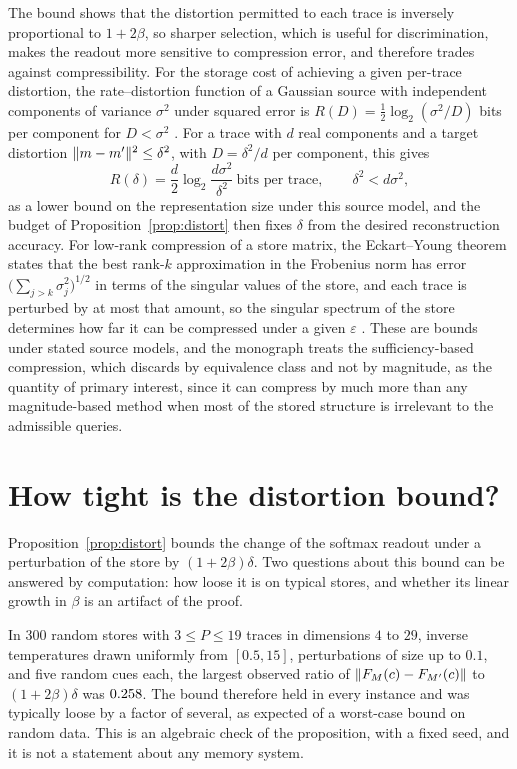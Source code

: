The bound shows that the distortion permitted to each trace is inversely proportional to $1+2\beta$, so sharper selection, which is useful for discrimination, makes the readout more sensitive to compression error, and therefore trades against compressibility. For the storage cost of achieving a given per-trace distortion, the rate--distortion function of a Gaussian source with independent components of variance $\sigma^2$ under squared error is $R(D)=\frac12\log_2(\sigma^2/D)$ bits per component for $D<\sigma^2$ \cite{cover2006}. For a trace with $d$ real components and a target distortion $\lVert m-m'\rVert^2\le\delta^2$, with $D=\delta^2/d$ per component, this gives
\begin{equation}
R(\delta)=\frac d2\log_2\frac{d\sigma^2}{\delta^2}\ \text{bits per trace},\qquad\delta^2<d\sigma^2,
\end{equation}
as a lower bound on the representation size under this source model, and the budget of Proposition~\ref{prop:distort} then fixes $\delta$ from the desired reconstruction accuracy. For low-rank compression of a store matrix, the Eckart--Young theorem states that the best rank-$k$ approximation in the Frobenius norm has error $\bigl(\sum_{j>k}\sigma_j^2\bigr)^{1/2}$ in terms of the singular values of the store, and each trace is perturbed by at most that amount, so the singular spectrum of the store determines how far it can be compressed under a given $\varepsilon$ \cite{eckart1936}. These are bounds under stated source models, and the monograph treats the sufficiency-based compression, which discards by equivalence class and not by magnitude, as the quantity of primary interest, since it can compress by much more than any magnitude-based method when most of the stored structure is irrelevant to the admissible queries.

\section*{How tight is the distortion bound?}\label{sec:distort30}

Proposition~\ref{prop:distort} bounds the change of the softmax readout under a perturbation of the store by $(1+2\beta)\delta$. Two questions about this bound can be answered by computation: how loose it is on typical stores, and whether its linear growth in $\beta$ is an artifact of the proof.

\begin{workedex}\label{ex:looseness30}
In 300 random stores with $3\le P\le19$ traces in dimensions $4$ to $29$, inverse temperatures drawn uniformly from $[0.5,15]$, perturbations of size up to $0.1$, and five random cues each, the largest observed ratio of $\lVert F_M(c)-F_{M'}(c)\rVert$ to $(1+2\beta)\delta$ was $0.258$. The bound therefore held in every instance and was typically loose by a factor of several, as expected of a worst-case bound on random data. This is an algebraic check of the proposition, with a fixed seed, and it is not a statement about any memory system.
\end{workedex}

